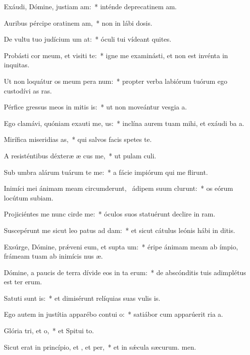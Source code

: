 \item Exáudi, Dómine, justiam am:~* inténde deprecatinem am.
\item Auribus pércipe oratinem am,~* non in lábi dosis.
\item De vultu tuo judícium um at:~* óculi tui vídeant quites.
\item Probásti cor meum, et visiti te:~* igne me examinásti, et non est invénta in  inquitas.
\item Ut non loquátur os meum pera num:~* propter verba labiórum tuórum ego custodívi as ras.
\item Pérfice gressus meos in mitis is:~* ut non moveántur vesgia a.
\item Ego clamávi, quóniam exauti me, us:~* inclína aurem tuam mihi, et exáudi ba a.
\item Mirífica miseridias as,~* qui salvos facis spetes  te.
\item A resisténtibus déxteræ æ cus me,~* ut pulam culi.
\item Sub umbra alárum tuárum te me:~* a fácie impiórum qui me flirunt.
\item Inimíci mei ánimam meam circumderunt,~\pscross{} ádipem suum clurunt:~* os eórum locútum  subiam.
\item Projiciéntes me nunc cirde me:~* óculos suos statuérunt declire in ram.
\item Suscepérunt me sicut leo patus ad dam:~* et sicut cátulus leónis hábi in ditis.
\item Exsúrge, Dómine, prǽveni eum, et supta um:~* éripe ánimam meam ab ímpio, frámeam tuam ab inimícis nus æ.
\item Dómine, a paucis de terra dívide eos in ta erum:~* de abscónditis tuis adimplétus est ter erum.
\item Satuti sunt is:~* et dimisérunt relíquias suas vulis is.
\item Ego autem in justítia apparébo contui o:~* satiábor cum apparúerit ria a.
\item Glória tri, et o,~* et Spitui to.
\item Sicut erat in princípio, et , et per,~* et in sǽcula sæcurum. men.
